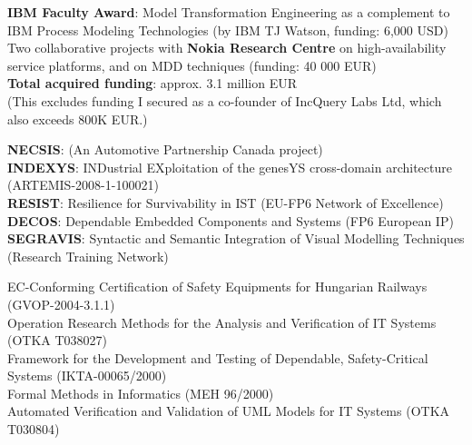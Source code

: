 \documentclass{xetexCV}
\begin{document}
\textbf{IBM Faculty Award}: Model Transformation Engineering as a
complement to IBM Process Modeling Technologies (by IBM TJ Watson, 
funding: 6,000 USD)  \\

Two collaborative projects with \textbf{Nokia Research Centre}
on high-availability service platforms, and on MDD%
techniques (funding: 40 000 EUR)\\

\textbf{Total acquired funding}: approx. 3.1 million EUR \\
(This excludes funding I secured as a co-founder of IncQuery Labs Ltd, which also exceeds 800K EUR.)


\textbf{NECSIS}:  (An Automotive Partnership Canada project)  \\
\textbf{INDEXYS}: INDustrial EXploitation of the genesYS
cross-domain architecture (ARTEMIS-2008-1-100021)  \\
\textbf{RESIST}: Resilience for Survivability in IST (EU-FP6
Network of Excellence)  \\
\textbf{DECOS}: Dependable Embedded Components and Systems (FP6
European IP) \\
\textbf{SEGRAVIS}: Syntactic and Semantic Integration of
Visual Modelling Techniques (Research Training Network) 


EC-Conforming  Certification of Safety Equipments for Hungarian
Railways (GVOP-2004-3.1.1) \\
Operation Research Methods  for the Analysis and Verification
of IT Systems (OTKA T038027) \\ 
Framework  for the Development and Testing of Dependable,
Safety-Critical Systems (IKTA-00065/2000) \\  
Formal Methods in Informatics (MEH 96/2000)  \\
Automated Verification  and Validation of UML Models for IT
Systems (OTKA T030804) 

\end{document}
